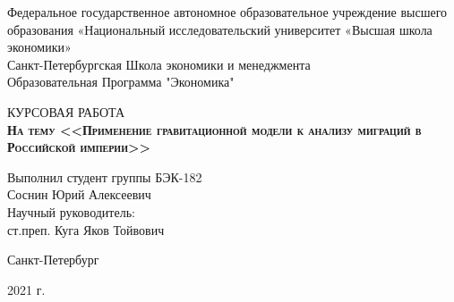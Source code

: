 \begin{center}
	Федеральное государственное автономное образовательное учреждение высшего образования «Национальный исследовательский университет «Высшая школа экономики»
	\\
	\bigskip
	Санкт-Петербургская Школа экономики и менеджмента \\
	Образовательная Программа "Экономика"
\end{center}

\vspace{8em}

\begin{center}
	{\Large КУРСОВАЯ РАБОТА}\\
	\textsc{\textbf{
			На тему
			\linebreak
			<<Применение гравитационной модели к анализу миграций в Российской империи>>}}
\end{center}

\vspace{2em}

\hfill\parbox{16cm}{
	\hspace*{5cm}\hspace*{-5cm}Выполнил студент группы БЭК-182\\
	Соснин Юрий Алексеевич\\
	
	\hspace*{5cm}\hspace*{-5cm}Научный руководитель:\\
	ст.преп. Куга Яков Тойвович\\
}

\vspace{\fill}

\begin{center}
	Санкт-Петербург
	
	2021 г.
\end{center}
\thispagestyle{empty}

\clearpage